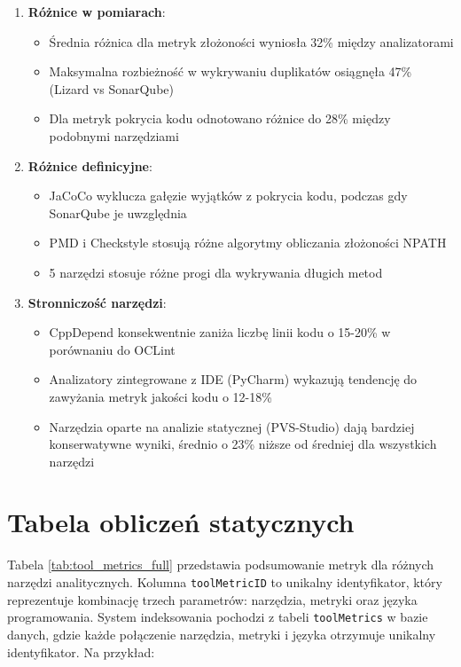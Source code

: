 \documentclass[a4paper,12pt]{article}
\begin{document}
\begin{enumerate}
\item \textbf{Różnice w pomiarach}:
\begin{itemize}
\item Średnia różnica dla metryk złożoności wyniosła 32\% między analizatorami
\item Maksymalna rozbieżność w wykrywaniu duplikatów osiągnęła 47\% (Lizard vs SonarQube)
\item Dla metryk pokrycia kodu odnotowano różnice do 28\% między podobnymi narzędziami
\end{itemize}

\item \textbf{Różnice definicyjne}:
\begin{itemize}
\item JaCoCo wyklucza gałęzie wyjątków z pokrycia kodu, podczas gdy SonarQube je uwzględnia
\item PMD i Checkstyle stosują różne algorytmy obliczania złożoności NPATH
\item 5 narzędzi stosuje różne progi dla wykrywania długich metod
\end{itemize}

\item \textbf{Stronniczość narzędzi}:
\begin{itemize}
\item CppDepend konsekwentnie zaniża liczbę linii kodu o 15-20\% w porównaniu do OCLint
\item Analizatory zintegrowane z IDE (PyCharm) wykazują tendencję do zawyżania metryk jakości kodu o 12-18\%
\item Narzędzia oparte na analizie statycznej (PVS-Studio) dają bardziej konserwatywne wyniki, średnio o 23\% niższe od średniej dla wszystkich narzędzi
\end{itemize}
\end{enumerate}

\section{Tabela obliczeń statycznych}

Tabela \ref{tab:tool_metrics_full} przedstawia podsumowanie metryk dla różnych narzędzi analitycznych. Kolumna \texttt{toolMetricID} to unikalny identyfikator, który reprezentuje kombinację trzech parametrów: narzędzia, metryki oraz języka programowania. System indeksowania pochodzi z tabeli \texttt{toolMetrics} w bazie danych, gdzie każde połączenie narzędzia, metryki i języka otrzymuje unikalny identyfikator. Na przykład:
\end{document}
